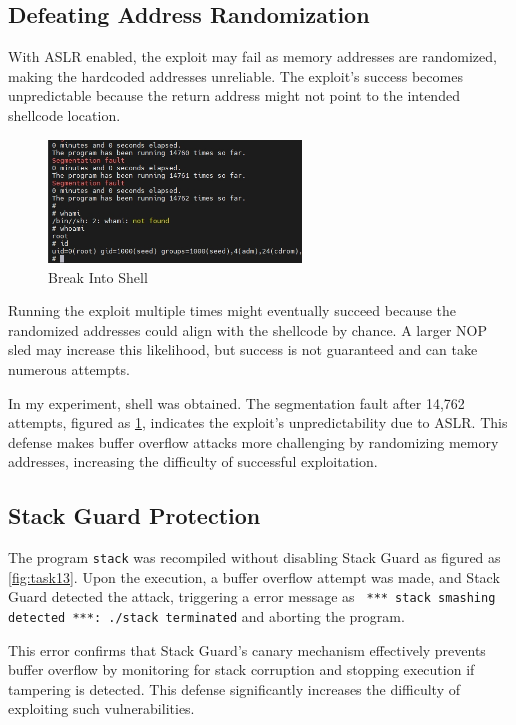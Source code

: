 \documentclass[a4paper,11pt]{article}
\begin{document}
\subsection{Defeating Address Randomization}
With ASLR enabled, the exploit may fail as memory addresses are randomized, making the hardcoded addresses unreliable. The exploit's success becomes unpredictable because the return address might not point to the intended shellcode location.
\begin{figure}[h]
    \centering
       \includegraphics[width=0.6\textwidth]{figures/section3/sec3-5.png}
    \caption{Break Into Shell}\label{fig:task12}
\end{figure}

Running the exploit multiple times might eventually succeed because the randomized addresses could align with the shellcode by chance. A larger NOP sled may increase this likelihood, but success is not guaranteed and can take numerous attempts.

In my experiment, shell was obtained. The segmentation fault after 14,762 attempts, figured as \ref{fig:task12}, indicates the exploit's unpredictability due to ASLR. This defense makes buffer overflow attacks more challenging by randomizing memory addresses, increasing the difficulty of successful exploitation.


\subsection{Stack Guard Protection}
The program \verb|stack| was recompiled without disabling Stack Guard as figured as \ref{fig:task13}. Upon the execution, a buffer overflow attempt was made, and Stack Guard detected the attack, triggering a error message as \verb| *** stack smashing detected ***: ./stack terminated| and aborting the program. 

This error confirms that Stack Guard's canary mechanism effectively prevents buffer overflow by monitoring for stack corruption and stopping execution if tampering is detected. This defense significantly increases the difficulty of exploiting such vulnerabilities.
\end{document}
